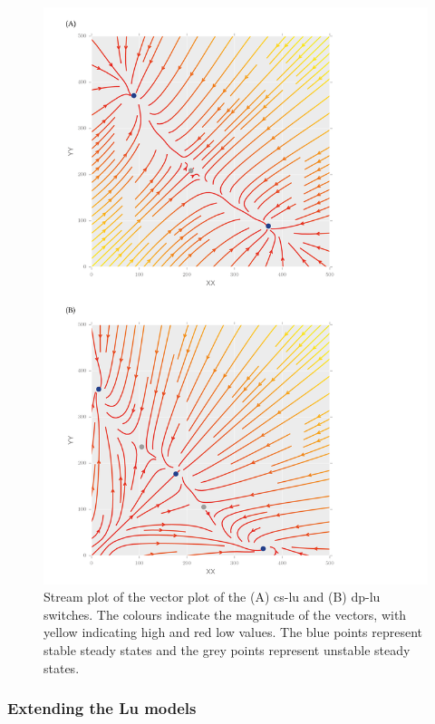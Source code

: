 \begin{figure}[htbp]
\begin{center}
	\includegraphics[scale=0.5]{../../chapters/chapterStabilityFinder/images/lu_bifurc.png}
	\caption[Phase plane analysis of the Lu toggle switch models]{\label{fig:lu_bifurc}  Stream plot of the vector plot of the (A) \acrshort{cs-lu} and (B) \acrshort{dp-lu} switches. The colours indicate the magnitude of the vectors, with yellow indicating high and red low values. The blue points represent stable steady states and the grey points represent unstable steady states.  }
\end{center}
\end{figure}
\clearpage
 
\subsubsection{Extending the Lu models}


